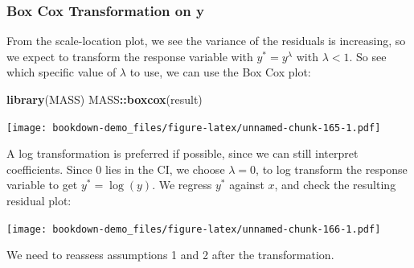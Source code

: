 \documentclass[
]{book}
\newenvironment{Shaded}{\begin{snugshade}}{\end{snugshade}}
\newcommand{\AttributeTok}[1]{\textcolor[rgb]{0.13,0.29,0.53}{#1}}
\newcommand{\DecValTok}[1]{\textcolor[rgb]{0.00,0.00,0.81}{#1}}
\newcommand{\DocumentationTok}[1]{\textcolor[rgb]{0.56,0.35,0.01}{\textbf{\textit{#1}}}}
\newcommand{\FunctionTok}[1]{\textcolor[rgb]{0.13,0.29,0.53}{\textbf{#1}}}
\newcommand{\NormalTok}[1]{#1}
\newcommand{\OtherTok}[1]{\textcolor[rgb]{0.56,0.35,0.01}{#1}}
\newcommand{\SpecialCharTok}[1]{\textcolor[rgb]{0.81,0.36,0.00}{\textbf{#1}}}
\begin{document}
\hypertarget{box-cox-transformation-on-y-1}{%
\subsubsection*{Box Cox Transformation on y}\label{box-cox-transformation-on-y-1}}

From the scale-location plot, we see the variance of the residuals is increasing, so we expect to transform the response variable with \(y^* = y^{\lambda}\) with \(\lambda < 1\). So see which specific value of \(\lambda\) to use, we can use the Box Cox plot:

\begin{Shaded}
\begin{Highlighting}[]
\FunctionTok{library}\NormalTok{(MASS)}
\NormalTok{MASS}\SpecialCharTok{::}\FunctionTok{boxcox}\NormalTok{(result)}
\end{Highlighting}
\end{Shaded}

\texttt{[image: bookdown-demo\_files/figure-latex/unnamed-chunk-165-1.pdf]}

A log transformation is preferred if possible, since we can still interpret coefficients. Since 0 lies in the CI, we choose \(\lambda = 0\), to log transform the response variable to get \(y^* = \log(y)\). We regress \(y^*\) against \(x\), and check the resulting residual plot:

\begin{Shaded}
\end{Shaded}

\texttt{[image: bookdown-demo\_files/figure-latex/unnamed-chunk-166-1.pdf]}

We need to reassess assumptions 1 and 2 after the transformation.
\end{document}
